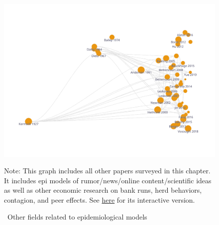 \newpage

\begin{figure}[!ht] \centering  %
	\caption{ ~Other fields related to epidemiological models}
	\label{fig:graph_other}
	\centerline{\includegraphics[width=\textwidth]{./figures/graph_other}}
				\begin{flushleft}{\footnotesize Note: This graph includes all other papers surveyed in this chapter. It includes epi models of rumor/news/online content/scientific ideas as well as other economic research on bank runs, herd behaviors, contagion, and peer effects. See \href{https://app.litmaps.co/shared/B5FA1F14-01A8-4C9D-BF23-BE0F62293FAF}{here} for its interactive version.}
						\end{flushleft}
\end{figure}


\newpage


